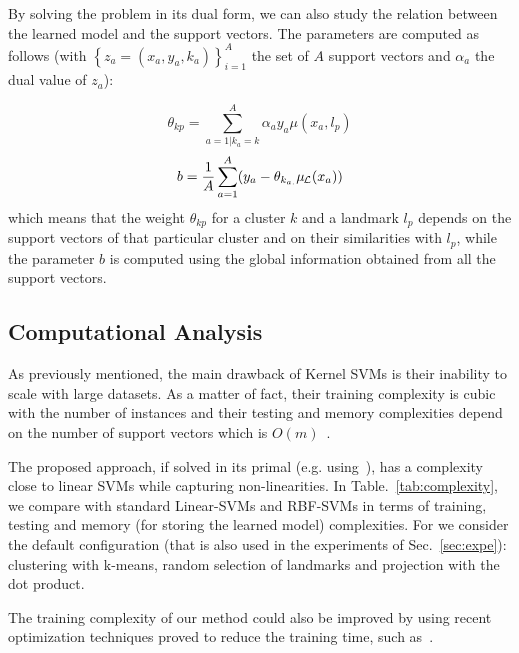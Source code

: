 By solving the problem in its dual form, we can also study the relation between the learned model and the support vectors.
The parameters are computed as follows (with $\left\{z_a = (x_a,y_a,k_a)\right\}_{i=1}^A$ the set of $A$ support vectors and $\alpha_a$ the dual value of $z_a$):

$$\theta_{kp} = \sum_{a=1 | k_{a}=k}^A \alpha_a y_a \mu(x_a,l_p)$$
$$b = \frac{1}{A}\sum_{a=1}^A (y_a - \theta_{k_{a.}} \mul{x_a}) $$
which means that the weight $\theta_{kp}$ for a cluster $k$ and a landmark $l_p$ depends on the support vectors of that particular cluster and on their similarities with $l_p$, while the parameter $b$ is computed using the global information obtained from all the support vectors. 

\subsection{Computational Analysis}
As previously mentioned, the main drawback of Kernel SVMs is their inability to scale with large datasets. As a matter of fact, their training complexity is cubic with the number of instances and their testing and memory complexities depend on the number of support vectors which is $O(m)$~\cite{steinwart2003sparseness}.

The proposed approach, if solved in its primal (e.g. using~\cite{REF08a}), has a complexity close to linear SVMs while capturing non-linearities. In Table.~\ref{tab:complexity}, we compare \landSVM with standard Linear-SVMs and RBF-SVMs in terms of training, testing and memory (for storing the learned model) complexities.
For \landSVM we consider the default configuration (that is also used in the experiments of Sec.~\ref{sec:expe}): clustering with k-means, random selection of landmarks and projection with the dot product. 

The training complexity of our method could also be improved by using recent optimization techniques proved to reduce the training time, such as~\cite{bakir2005breaking,bordes2009sgd}.

\begin{table}
    \caption{Computational comparison, with $K$: the number of clusters ($K \ll m$), $L$: the number of landmarks ($O(n)$), with $n$: the number of features, and $m$: the number of training instances.}
    \label{tab:complexity}
    \centering
\label{fig:complexity}
\end{table}
